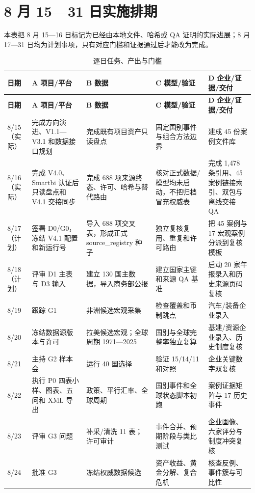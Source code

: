 \documentclass[UTF8,fontset=windows,12pt,openany]{ctexbook}
\begin{document}
\chapter{8 月 15—31 日实施排期}
\clearpage
\begin{landscape}

本表把 8 月 15—16 日标记为已经由本地文件、哈希或 QA 证明的实际进展；8 月 17—31 日均为计划事项，只有对应门槛和证据通过后才能改为完成。
\begin{longtable}{p{2.2cm}p{4.1cm}p{3.7cm}p{3.7cm}p{3.7cm}}
\caption{逐日任务、产出与门槛}\label{tab:schedule}\\
\toprule
\textbf{日期} & \textbf{A 项目/平台} & \textbf{B 数据} & \textbf{C 模型/验证} & \textbf{D 企业/证据/交付}\\
\midrule
\endfirsthead
\toprule \textbf{日期} & \textbf{A 项目/平台} & \textbf{B 数据} & \textbf{C 模型/验证} & \textbf{D 企业/证据/交付}\\ \midrule
\endhead
8/15（实际） & 完成方向演进、V1.1—V3.1 和数据接口规划 & 完成既有项目资产只读盘点 & 固定国别事件与组合方法边界 & 建成 45 份案例文件库\\
8/16（实际） & 完成 V4.0、Smartbi 认证后只读盘点和 V4.1 交接同步 & 完成 688 项来源终态、许可、哈希与替代路由 & 核对正式数据/模型均未启动，不把归档冒充权威表 & 完成 1,478 条引用、45 案例链接索引、双包与离线交接 QA\\
8/17（计划） & 签署 D0/G0，冻结 V4.1 配置和新运行号 & 导入 688 项交叉表，形成正式 source\_registry 种子 & 独立复核复用、重复和许可路由 & 把 45 案例与 17 宏观案例分派到复核模板\\
8/18（计划） & 评审 D1 主表与 D3 输入 & 建立 130 国主数据，导入商务部公报 & 建立国家主键和来源 QA 基准 & 启动 20 家年报录入和历史来源页码复核\\
8/19 & 跟踪 G1 & 非洲候选宏观采集 & 检查覆盖和币制跳点 & 汽车/装备企业录入\\
8/20 & 冻结数据源版本与许可 & 拉美候选宏观；全球周期 1971—2025 & 国别与全球完整率独立复算 & 基建/资源企业录入、历史制度复核\\
8/21 & 主持 G2 样本会 & 运行 40 国选择 & 验证 15/14/11 和对照 & 企业关键数字双复核\\
8/22 & 执行 P0 四表小样、图表、五问和 XML 导出 & 政策、平行汇率、全球周期 & 国别事件和全球状态脚本初跑 & 案例证据矩阵与 17 历史事件\\
8/23 & 评审 G3 问题 & 补采/清洗 11 表；许可审计 & 事件合并、预期阶段与类比测试 & 企业画像、六家评分与制度冲突复核\\
8/24 & 批准 G3 & 冻结权威数据候选 & 资产收益、黄金分解、复合危机 & 核查反例、事件簇与可比性\\

\end{longtable}
\end{landscape}
\end{document}
